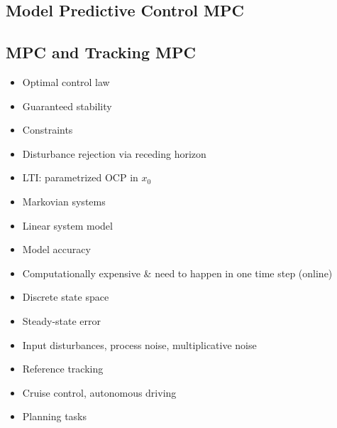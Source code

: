 \begin{mdframed}[backgroundcolor=red!20, frametitlerulewidth=0pt, innertopmargin=-2mm, innerbottommargin=2mm, skipabove=0mm]

\section{Model Predictive Control MPC}
\end{mdframed}
\subsection{MPC and Tracking MPC}
\begin{minipage}{0.33\textwidth}
    \begin{tcolorbox}[colframe=green!50!black, colback=green!5!white, title=Pros, left=0.5mm, right=0.5mm]
    \begin{itemize}[leftmargin=*]
        \item Optimal control law
        \item Guaranteed stability 
        \item Constraints
        \item Disturbance rejection via receding horizon
        \item LTI: parametrized OCP in $x_0$
        \item Markovian systems
    \end{itemize}
    \end{tcolorbox}
\end{minipage}
\begin{minipage}{0.33\textwidth}
    \begin{tcolorbox}[colframe=red!50!black, colback=red!5!white, title=Cons, left=0.5mm, right=0.5mm]
    \begin{itemize}[leftmargin=*]
        \item Linear system model
        \item Model accuracy 
        \item Computationally expensive \& need to happen in one time step (online)
        \item Discrete state space
        \item Steady-state error
        \item Input disturbances, process noise, multiplicative noise
    \end{itemize}
    \end{tcolorbox}
\end{minipage}
\begin{minipage}{0.33\textwidth}
    \begin{tcolorbox}[colframe=gray!50!black, colback=gray!5!white, title=Examples, left=0.5mm, right=0.5mm]
    \begin{itemize}[leftmargin=*]
        \item Reference tracking
        \item Cruise control, autonomous driving
        \item Planning tasks
    \end{itemize}
    \end{tcolorbox}
\end{minipage}\\ \\
